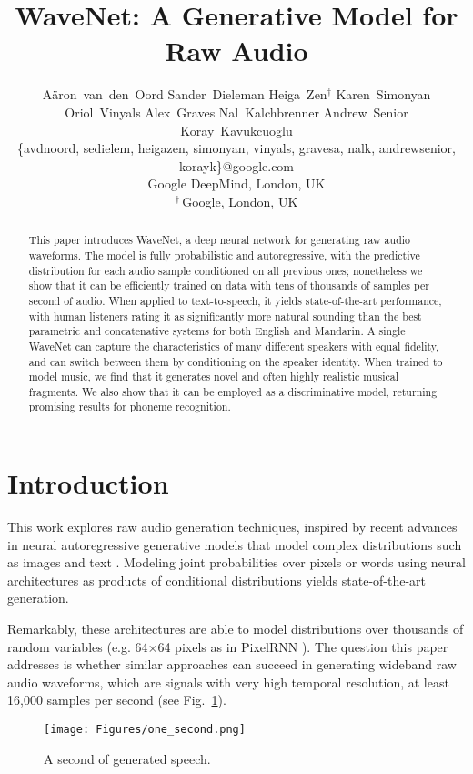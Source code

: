 \documentclass{article}
\title{
WaveNet: A Generative Model for Raw Audio
}
\author{A\"{a}ron~van~den~Oord \And
\hspace{-0.5cm}Sander~Dieleman \And
Heiga~Zen$^\dagger$ \AND
Karen~Simonyan \And
Oriol~Vinyals \And
Alex~Graves \AND
Nal~Kalchbrenner \And
\hspace{1cm}Andrew~Senior \And
Koray~Kavukcuoglu \AND \\
\{avdnoord, sedielem, heigazen, simonyan, vinyals, gravesa, nalk, andrewsenior, korayk\}@google.com\\
Google DeepMind, London, UK \\ 
$^\dagger$\,Google, London, UK
}
\makeatletter
\newcommand{\figref}[1]{Fig.~\ref{#1}}
\newcommand*{\eg}{e.g.\@\xspace}
\makeatother
\begin{document}
 


\maketitle


\vskip 0.3in


\begin{abstract}
This paper introduces WaveNet, a deep neural network for generating raw audio waveforms. The model is fully probabilistic and autoregressive, with the predictive distribution for each audio sample conditioned on all previous ones; nonetheless we show that it can be efficiently trained on data with tens of thousands of samples per second of audio. 
When applied to text-to-speech, it yields state-of-the-art performance, with human listeners rating it as significantly more natural sounding than the best parametric and concatenative systems for both English and Mandarin. A single WaveNet can capture the characteristics of many different speakers with equal fidelity, and can switch between them by conditioning on the speaker identity. When trained to model music, we find that it generates novel and often highly realistic musical fragments. We also show that it can be employed as a discriminative model, returning promising results for phoneme recognition.
\end{abstract} 


\section{Introduction}

This work explores raw audio generation techniques, inspired by recent advances in neural autoregressive generative models that model complex distributions such as images \citep{van2016pixel, ConditionalPixelCNN} and text \citep{RafalLanguage}. Modeling joint probabilities over pixels or words using neural architectures as products of conditional distributions yields state-of-the-art generation.

Remarkably, these architectures are able to model distributions over thousands of random variables (\eg 64$\times$64 pixels as in PixelRNN \citep{van2016pixel}). The question this paper addresses is whether similar approaches can succeed in generating wideband raw audio waveforms, which are signals with very high temporal resolution, at least 16,000 samples per second (see \figref{fig:audio}).

\begin{figure}[htb]
\texttt{[image: Figures/one\_second.png]}
\caption{A second of generated speech.}
\label{fig:audio}
\end{figure}
\end{document}
